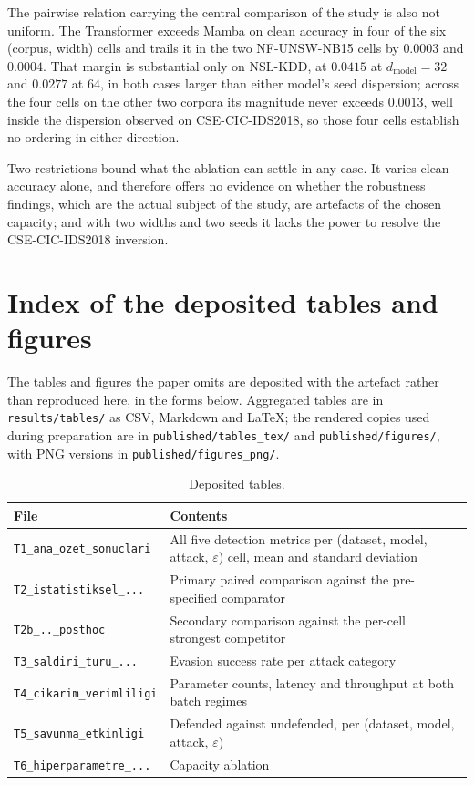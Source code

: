 \documentclass[11pt,a4paper]{article}
\begin{document}
The pairwise relation carrying the central comparison of the study is
also not uniform. The Transformer exceeds Mamba on clean accuracy in
four of the six (corpus, width) cells and trails it in the two
NF-UNSW-NB15 cells by $0.0003$ and $0.0004$. That margin is substantial
only on NSL-KDD, at $0.0415$ at $d_{\mathrm{model}}=32$ and $0.0277$ at
$64$, in both cases larger than either model's seed dispersion; across
the four cells on the other two corpora its magnitude never exceeds
$0.0013$, well inside the dispersion observed on CSE-CIC-IDS2018, so
those four cells establish no ordering in either direction.

Two restrictions bound what the ablation can settle in any case. It
varies clean accuracy alone, and therefore offers no evidence on
whether the robustness findings, which are the actual subject of the
study, are artefacts of the chosen capacity; and with two widths and
two seeds it lacks the power to resolve the CSE-CIC-IDS2018 inversion.

\section{Index of the deposited tables and figures}
\label{sup:index}

The tables and figures the paper omits are deposited with the artefact
rather than reproduced here, in the forms below. Aggregated tables are
in \texttt{results/tables/} as CSV, Markdown and \LaTeX{}; the rendered
copies used during preparation are in \texttt{published/tables\_tex/}
and \texttt{published/figures/}, with PNG versions in
\texttt{published/figures\_png/}.

\begin{table}[h]
\centering
\caption{Deposited tables.}
\small
\begin{tabular}{@{}l p{}@{}}
\toprule
File & Contents \\
\midrule
\texttt{T1\_ana\_ozet\_sonuclari}      & All five detection metrics per (dataset, model, attack, $\varepsilon$) cell, mean and standard deviation \\
\texttt{T2\_istatistiksel\_...} & Primary paired comparison against the pre-specified comparator \\
\texttt{T2b\_..\_posthoc}              & Secondary comparison against the per-cell strongest competitor \\
\texttt{T3\_saldiri\_turu\_...} & Evasion success rate per attack category \\
\texttt{T4\_cikarim\_verimliligi}      & Parameter counts, latency and throughput at both batch regimes \\
\texttt{T5\_savunma\_etkinligi} & Defended against undefended, per (dataset, model, attack, $\varepsilon$) \\
\texttt{T6\_hiperparametre\_...} & Capacity ablation \\
\bottomrule
\end{tabular}
\end{table}
\end{document}
